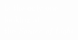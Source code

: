 \documentclass[preview,convert={density=600,outext=.png,command=\unexpanded{ {\convertexe\space -density \density\space\infile\space \ifx\size\empty\else -resize \size\fi\space -quality 90 -trim +repage -background "rgba(50,50,50,0.5)" -bordercolor "rgba(50,50,50,0.5)" -border 25 -flatten \outfile} } }]{standalone}
\begin{document}
\begin{center}
\textcolor{white}{
Is the only one \\
looking at \\
the \textit{Source of Light} \\
 \\}
\end{center}
\end{document}
